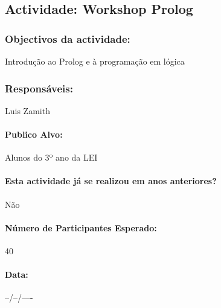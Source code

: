 \subsection{Actividade: Workshop Prolog} %

\subsubsection*{Objectivos da actividade:}
Introdução ao Prolog e à programação em lógica

\subsubsection*{Responsáveis:}
\begin{itemizedash}
	\item{Luis Zamith}
\end{itemizedash}

\paragraph{Publico Alvo: }
Alunos do 3º ano da LEI

\paragraph{Esta actividade já se realizou em anos anteriores?}
Não

\paragraph{Número de Participantes Esperado:}
40

\paragraph{Data:} --/--/----

\vspace{20pt}
